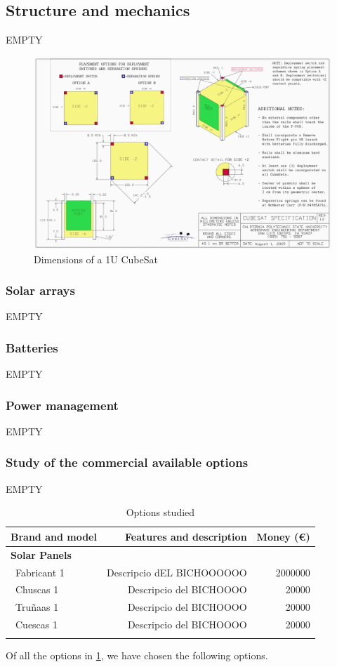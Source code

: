 \subsection{Structure and mechanics}

EMPTY

\begin{figure}[h]
\includegraphics[scale=0.6]{./sections/SatelliteDesign/images/CubeSatDesign}
\centering
\caption{Dimensions of a 1U CubeSat \cite{cubesatdimensions}}
\end{figure}

\subsubsection{Solar arrays}
EMPTY
\subsubsection{Batteries}
EMPTY
\subsubsection{Power management}
EMPTY
\subsubsection{Study of the commercial available options}
EMPTY

\begin{longtable}{| l | r | r | }
\hline
\rowcolor[gray]{0.80}	\textbf{Brand and model} &  \textbf{Features and description}     & \textbf{Money (\euro)}   \\
\hline
\endfirsthead

\rowcolor[gray]{0.85} \textbf{Solar Panels} &  &  \\
	   ~Fabricant 1 & Descripcio dEL BICHOOOOOO & 2000000 \\
	   ~Chuscas 1 & Descripcio del BICHOOOO & 20000 \\
	   ~Truñaas 1 & Descripcio del BICHOOOO & 20000 \\
	   ~Cuescas 1 & Descripcio del BICHOOOO & 20000 \\
	\hline

\caption{Options studied}
\label{epsoptionstable}
\end{longtable}

Of all the options in \ref{epsoptionstable}, we have chosen the following options.
